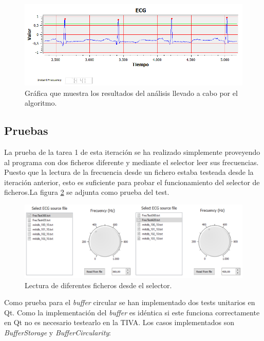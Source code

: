        \begin{figure}[H]
                \centering
                        \includegraphics[width =\linewidth]{figuras/ResultsBasic.png}
                \caption{Gráfica que muestra los resultados del análisis llevado a cabo por el algoritmo.}
                \label{fig:resultsBasic}
        \end{figure}
        
    \subsection{Pruebas}
        
        La prueba de la tarea 1 de esta iteración se ha realizado simplemente proveyendo al programa con dos ficheros diferente y mediante el selector leer sus frecuencias. Puesto que la lectura de la frecuencia desde un fichero estaba testeada desde la iteración anterior, esto es suficiente para probar el funcionamiento del selector de ficheros.La figura \ref{fig:fileSelectorTest} se adjunta como prueba del test.

        \begin{figure}[H]
                \centering
                        \includegraphics[width = \linewidth]{figuras/FileSelectorTest.png}
                \caption{Lectura de diferentes ficheros desde el selector.}
                \label{fig:fileSelectorTest}
        \end{figure}

        \clearpage
        Como prueba para el \textit{buffer} circular se han implementado dos tests unitarios en Qt. Como la implementación del \textit{buffer} es idéntica si este funciona correctamente en Qt no es necesario testearlo en la TIVA. Los casos implementados son \textit{BufferStorage} y \textit{BufferCircularity}: 
        
